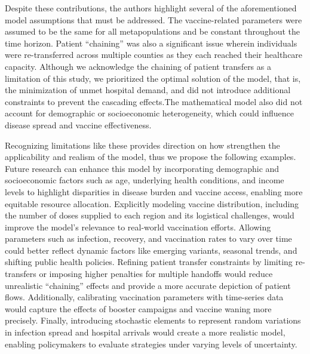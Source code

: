 \documentclass{article}
\begin{document}
Despite these contributions, the authors highlight several of the aforementioned model assumptions that must be addressed. The vaccine-related parameters were assumed to be the same for all metapopulations and be constant throughout the time horizon. Patient ``chaining'' was also a significant issue wherein individuals were re-transferred across multiple counties as they each reached their healthcare capacity. {\color{blue} Although we acknowledge the chaining of patient transfers as a limitation of this study, we prioritized the optimal solution of the model, that is, the minimization of unmet hospital demand, and did not introduce additional constraints to prevent the cascading effects.}The mathematical model also did not account for demographic or socioeconomic heterogeneity, which could influence disease spread and vaccine effectiveness. 

Recognizing limitations like these provides direction on how strengthen the applicability and realism of the model, thus we propose the following examples. Future research can enhance this model by incorporating demographic and socioeconomic factors such as age, underlying health conditions, and income levels to highlight disparities in disease burden and vaccine access, enabling more equitable resource allocation. Explicitly modeling vaccine distribution, including the number of doses supplied to each region and its logistical challenges, would improve the model's relevance to real-world vaccination efforts. Allowing parameters such as infection, recovery, and vaccination rates to vary over time could better reflect dynamic factors like emerging variants, seasonal trends, and shifting public health policies. Refining patient transfer constraints by limiting re-transfers or imposing higher penalties for multiple handoffs would reduce unrealistic ``chaining'' effects and provide a more accurate depiction of patient flows. Additionally, calibrating vaccination parameters with time-series data would capture the effects of booster campaigns and vaccine waning more precisely. Finally, introducing stochastic elements to represent random variations in infection spread and hospital arrivals would create a more realistic model, enabling policymakers to evaluate strategies under varying levels of uncertainty.



\printbibliography[heading=subbibintoc, title={References}]
\end{document}
